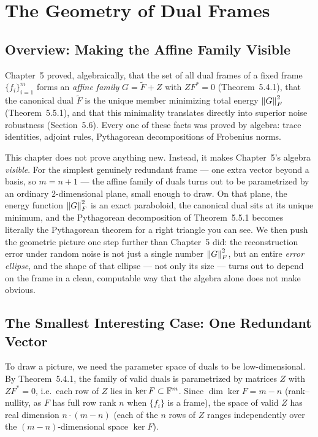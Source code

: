 \chapter{The Geometry of Dual Frames}
\label{ch:dual-geometry}
\section{Overview: Making the Affine Family Visible}
\label{sec:ch6-overview}

Chapter~5 proved, algebraically, that the set of all dual frames of a
fixed frame $\{f_i\}_{i=1}^m$ forms an \emph{affine family}
$G = \tilde F + Z$ with $ZF^*=0$ (Theorem~5.4.1), that the canonical
dual $\tilde F$ is the unique member minimizing total energy
$\left\| G \right\|_F^2$ (Theorem~5.5.1), and that this minimality translates
directly into superior noise robustness (Section~5.6). Every one of
these facts was proved by algebra: trace identities, adjoint rules,
Pythagorean decompositions of Frobenius norms.

This chapter does not prove anything new. Instead, it makes Chapter~5's
algebra \emph{visible}. For the simplest genuinely redundant frame ---
one extra vector beyond a basis, so $m=n+1$ --- the affine family of
duals turns out to be parametrized by an ordinary $2$-dimensional plane,
small enough to draw. On that plane, the energy function $\left\| G \right\|_F^2$
is an exact paraboloid, the canonical dual sits at its unique minimum,
and the Pythagorean decomposition of Theorem~5.5.1 becomes literally the
Pythagorean theorem for a right triangle you can see. We then push the
geometric picture one step further than Chapter~5 did: the
reconstruction error under random noise is not just a single number
$\left\| G \right\|_F^2$, but an entire \emph{error ellipse}, and the shape of
that ellipse --- not only its size --- turns out to depend on the frame
in a clean, computable way that the algebra alone does not make obvious.

\section{The Smallest Interesting Case: One Redundant Vector}
\label{sec:smallest-case}

To draw a picture, we need the parameter space of duals to be
low-dimensional. By Theorem~5.4.1, the family of valid duals is
parametrized by matrices $Z$ with $ZF^*=0$, i.e.\ each row of $Z$ lies
in $\ker F\subset\mathbb{F}^m$. Since $\dim\ker F = m-n$ (rank--nullity, as
$F$ has full row rank $n$ when $\{f_i\}$ is a frame), the space of valid
$Z$ has real dimension $n\cdot(m-n)$ (each of the $n$ rows of $Z$ ranges
independently over the $(m-n)$-dimensional space $\ker F$).

